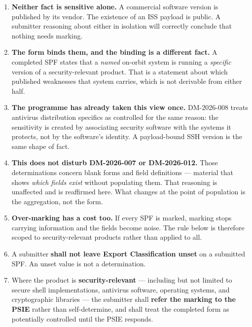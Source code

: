 {\begin{enumerate}

\item \textbf{Neither fact is sensitive alone.} A commercial software version
is published by its vendor. The existence of an ISS payload is public. A
submitter reasoning about either in isolation will correctly conclude that
nothing needs marking.

\item \textbf{The form binds them, and the binding is a different fact.} A
completed SPF states that a \emph{named} on-orbit system is running a
\emph{specific} version of a security-relevant product. That is a statement
about which published weaknesses that system carries, which is not derivable
from either half.

\item \textbf{The programme has already taken this view once.} DM-2026-008
treats antivirus distribution specifics as controlled for the same reason: the
sensitivity is created by associating security software with the systems it
protects, not by the software's identity. A payload-bound SSH version is the
same shape of fact.

\item \textbf{This does not disturb DM-2026-007 or DM-2026-012.} Those
determinations concern blank forms and field definitions --- material that
shows \emph{which fields exist} without populating them. That reasoning is
unaffected and is reaffirmed here. What changes at the point of population is
the aggregation, not the form.

\item \textbf{Over-marking has a cost too.} If every SPF is marked, marking
stops carrying information and the fields become noise. The rule below is
therefore scoped to security-relevant products rather than applied to all.


\item A submitter \textbf{shall not leave Export Classification unset} on a
submitted SPF. An unset value is not a determination.

\item Where the product is \textbf{security-relevant} --- including but not
limited to secure shell implementations, antivirus software, operating systems,
and cryptographic libraries --- the submitter shall \textbf{refer the marking to
the PSIE} rather than self-determine, and shall treat the completed form as
potentially controlled until the PSIE responds.


\end{enumerate}}
